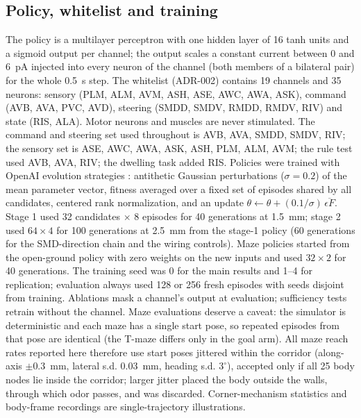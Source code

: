 \documentclass[11pt,a4paper]{article}
\begin{document}
\subsection*{Policy, whitelist and training}
The policy is a multilayer perceptron with one hidden layer of 16 tanh units and a sigmoid output per channel; the output scales a constant current between 0 and 6~pA injected into every neuron of the channel (both members of a bilateral pair) for the whole 0.5~s step. The whitelist (ADR-002) contains 19 channels and 35 neurons: sensory (PLM, ALM, AVM, ASH, ASE, AWC, AWA, ASK), command (AVB, AVA, PVC, AVD), steering (SMDD, SMDV, RMDD, RMDV, RIV) and state (RIS, ALA). Motor neurons and muscles are never stimulated. The command and steering set used throughout is AVB, AVA, SMDD, SMDV, RIV; the sensory set is ASE, AWC, AWA, ASK, ASH, PLM, ALM, AVM; the rule test used AVB, AVA, RIV; the dwelling task added RIS. Policies were trained with OpenAI evolution strategies \cite{r8}: antithetic Gaussian perturbations ($\sigma = 0.2$) of the mean parameter vector, fitness averaged over a fixed set of episodes shared by all candidates, centered rank normalization, and an update $\theta \leftarrow \theta + (0.1/\sigma)\,\overline{\epsilon F}$. Stage 1 used 32 candidates $\times$ 8 episodes for 40 generations at 1.5~mm; stage 2 used $64 \times 4$ for 100 generations at 2.5~mm from the stage-1 policy (60 generations for the SMD-direction chain and the wiring controls). Maze policies started from the open-ground policy with zero weights on the new inputs and used $32 \times 2$ for 40 generations. The training seed was 0 for the main results and 1--4 for replication; evaluation always used 128 or 256 fresh episodes with seeds disjoint from training. Ablations mask a channel's output at evaluation; sufficiency tests retrain without the channel. Maze evaluations deserve a caveat: the simulator is deterministic and each maze has a single start pose, so repeated episodes from that pose are identical (the T-maze differs only in the goal arm). All maze reach rates reported here therefore use start poses jittered within the corridor (along-axis $\pm 0.3$~mm, lateral s.d. 0.03~mm, heading s.d. $3^\circ$), accepted only if all 25 body nodes lie inside the corridor; larger jitter placed the body outside the walls, through which odor passes, and was discarded. Corner-mechanism statistics and body-frame recordings are single-trajectory illustrations.
\end{document}
